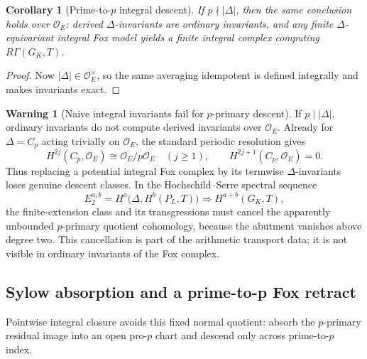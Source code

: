 \documentclass[11pt]{article}
\newtheorem{corollary}[theorem]{Corollary}
\theoremstyle{definition}
\newtheorem{warning}[theorem]{Warning}
\begin{document}
\begin{corollary}[Prime-to-$p$ integral descent]\label{cor:prime-to-p-integral-descent}
If $p\nmid |\Delta|$, then the same conclusion holds over $\mathcal O_E$: derived $\Delta$-invariants are ordinary invariants, and any finite $\Delta$-equivariant integral Fox model yields a finite integral complex computing $R\Gamma(G_K,T)$.
\end{corollary}

\begin{proof}
Now $|\Delta|\in\mathcal O_E^\times$, so the same averaging idempotent is defined integrally and makes invariants exact.
\end{proof}

\begin{warning}[Naive integral invariants fail for $p$-primary descent]\label{warn:integral-delta-invariants}
If $p\mid|\Delta|$, ordinary invariants do not compute derived invariants over $\mathcal O_E$.  Already for $\Delta=C_p$ acting trivially on $\mathcal O_E$, the standard periodic resolution gives
\[
H^{2j}(C_p,\mathcal O_E)\cong \mathcal O_E/p\mathcal O_E
\quad(j\ge1),
\qquad
H^{2j+1}(C_p,\mathcal O_E)=0.
\]
Thus replacing a potential integral Fox complex by its termwise $\Delta$-invariants loses genuine descent classes.  In the Hochschild--Serre spectral sequence
\[
E_2^{a,b}=H^a\bigl(\Delta,H^b(P_L,T)\bigr)
\Longrightarrow H^{a+b}(G_K,T),
\]
the finite-extension class and its transgressions must cancel the apparently unbounded $p$-primary quotient cohomology, because the abutment vanishes above degree two.  This cancellation is part of the arithmetic transport data; it is not visible in ordinary invariants of the Fox complex.
\end{warning}


\subsection{Sylow absorption and a prime-to-p Fox retract}

Pointwise integral closure avoids this fixed normal quotient: absorb the $p$-primary residual image into an open pro-$p$ chart and descend only across prime-to-$p$ index.
\end{document}
